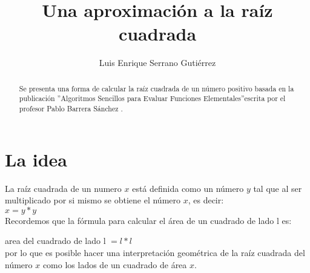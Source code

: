 \documentclass[letter,12pt]{article}
\title{Una aproximación a la raíz cuadrada}
\author{Luis Enrique Serrano Gutiérrez}
\begin{document}
\maketitle


\begin{abstract}
Se presenta una forma de calcular la raíz cuadrada de un número positivo basada en la publicación ''Algoritmos Sencillos para Evaluar Funciones Elementales''escrita por el profesor Pablo Barrera Sánchez \cite{AlgoritmosPablo}.
\end{abstract}
\iffalse
 Es conocido el algoritmo para calcular la raíz cuadrada que requiere separar de dos en dos cifras de derecha a izquierda del punto decimal para buscar un número que multiplicado $y$ por si mismo sea lo más cercano al numero de a lo más dos cifras que se encuentre en el extremo izquierdo de la expresión, por el momento esta solución no es de nuestro interés.
\fi

\section*{La idea}
La raíz cuadrada de un numero $x$ está definida como un número $y$ tal que al ser multiplicado por si mismo se obtiene el número $x$, es decir:\\

$ x = y*y$\\

Recordemos que la fórmula para calcular el área de un cuadrado de lado l es:

 area del cuadrado de lado l $= l * l  $\\
 
 por lo que es posible hacer una interpretación geométrica de la raíz cuadrada del número $x$ como los lados de un cuadrado de área $x$.\\
 \pagebreak
\end{document}
